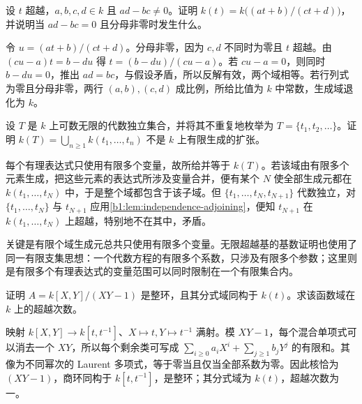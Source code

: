 \begin{exercise}\label{b1:ex:14-11}
	设 \(t\) 超越，\(a,b,c,d\in k\) 且 \(ad-bc\neq0\)。证明 \(k(t)=k\bigl((at+b)/(ct+d)\bigr)\)，并说明当 \(ad-bc=0\) 且分母非零时发生什么。
\end{exercise}
\begin{solution}
	令 \(u=(at+b)/(ct+d)\)。分母非零，因为 \(c,d\) 不同时为零且 \(t\) 超越。由 \((cu-a)t=b-du\) 得 \(t=(b-du)/(cu-a)\)。若 \(cu-a=0\)，则同时 \(b-du=0\)，推出 \(ad=bc\)，与假设矛盾，所以反解有效，两个域相等。若行列式为零且分母非零，两行 \((a,b),(c,d)\) 成比例，所给比值为 \(k\) 中常数，生成域退化为 \(k\)。
\end{solution}

\begin{exercise}\label{b1:ex:14-12}
	设 \(T\) 是 \(k\) 上可数无限的代数独立集合，并将其不重复地枚举为 \(T=\{t_1,t_2,\ldots\}\)。证明 \(k(T)=\bigcup_{n\geq1}k(t_1,\ldots,t_n)\) 不是 \(k\) 上有限生成的扩张。
\end{exercise}
\begin{solution}
	每个有理表达式只使用有限多个变量，故所给并等于 \(k(T)\)。若该域由有限多个元素生成，把这些元素的表达式所涉及变量合并，便有某个 \(N\) 使全部生成元都在 \(k(t_1,\ldots,t_N)\) 中，于是整个域都包含于该子域。但 \(\{t_1,\ldots,t_N,t_{N+1}\}\) 代数独立，对 \(\{t_1,\ldots,t_N\}\) 与 \(t_{N+1}\) 应用\cref{b1:lem:independence-adjoining}，便知 \(t_{N+1}\) 在 \(k(t_1,\ldots,t_N)\) 上超越，特别地不在其中，矛盾。

	关键是有限个域生成元总共只使用有限多个变量。无限超越基的基数证明也使用了同一有限支集思想：一个代数方程的有限多个系数，只涉及有限多个参数；这里则是有限多个有理表达式的变量范围可以同时限制在一个有限集合内。
\end{solution}

\begin{exercise}\label{b1:ex:14-13}
	证明 \(A=k[X,Y]/(XY-1)\) 是整环，且其分式域同构于 \(k(t)\)。求该函数域在 \(k\) 上的超越次数。
\end{exercise}
\begin{solution}
	映射 \(k[X,Y]\rightarrow k[t,t^{-1}]\)、\(X\mapsto t,Y\mapsto t^{-1}\) 满射。模 \(XY-1\)，每个混合单项式可以消去一个 \(XY\)，所以每个剩余类可写成 \(\sum_{i\geq0}a_iX^i+\sum_{j\geq1}b_jY^j\) 的有限和。其像为不同幂次的 Laurent 多项式，等于零当且仅当全部系数为零。因此核恰为 \((XY-1)\)，商环同构于 \(k[t,t^{-1}]\)，是整环；其分式域为 \(k(t)\)，超越次数为一。
\end{solution}

